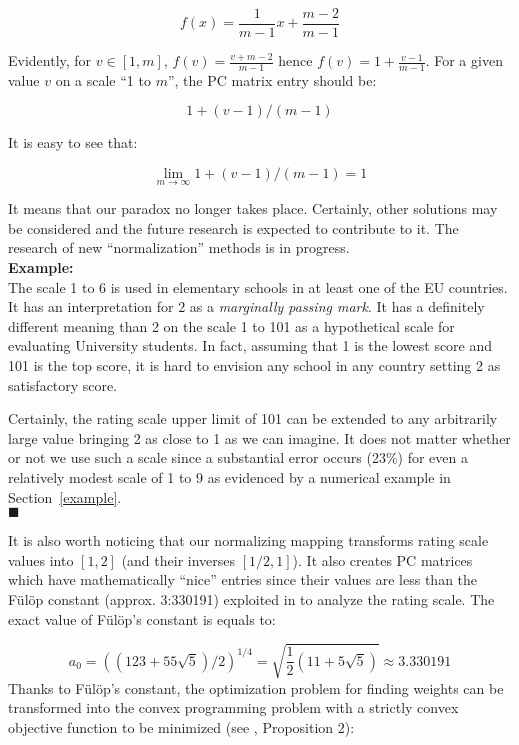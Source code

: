 \documentclass [12pt]{article}
\begin{document}
$$f(x)=\frac{1}{m-1}x+\frac{m-2}{m-1}$$

Evidently, for $v\in [1, m]$, $ f(v)=\frac{v+m-2}{m-1}$  hence $ f(v)=1+\frac{v-1}{m-1}$.
For a given value $v$ on a scale ``1 to $m$'', the PC matrix entry should be:

\begin{equation}
 1+(v-1)/(m-1) 
\end{equation}

\noindent It is easy to see that: 

$$\lim_{m\to\infty} {1+(v-1)/(m-1)}=1$$ 

It means that our  paradox no longer takes place. Certainly, other solutions may be considered and the future research is expected to contribute to it. The research of new ``normalization'' methods is in progress. \\

\noindent \textbf{Example:} \\

The scale 1 to 6 is used in elementary schools in at least one of the EU countries. It has an interpretation for 2 as a \textit{marginally passing mark}. It has a definitely different meaning than 2 on the scale 1 to 101 as a hypothetical scale for evaluating University students.
In fact, assuming that 1 is the lowest score and 101 is the top score, it is hard to envision any school in any country setting 2 as satisfactory
score.

Certainly, the rating scale upper limit of 101 can be extended to any arbitrarily large value bringing 2 as close to 1 as we can imagine. It does not matter whether or not we use such a scale since a substantial error occurs (23\%) for even a relatively modest scale of 1 to 9 as evidenced by a numerical example in Section~\ref{example}.\\
$\blacksquare$

It is also worth noticing that our normalizing mapping transforms rating scale values into $[1, 2]$ (and their inverses $ [1/2, 1] $). It also creates PC matrices which have mathematically ``nice'' entries since their values are less than the F\"ul\"op constant (approx. 3:330191) exploited in \cite{FKS2010} to analyze the rating scale. The exact value of F\"ul\"op's constant is equals to:

\begin{equation}
a_0=((123+55\sqrt 5)/2)^{1/4}=\sqrt{\frac{1}{2} \left(11+5
\sqrt{5}\right)}\approx 3.330191
\end{equation}
Thanks to F\"ul\"op's constant, the optimization problem for finding weights can be transformed into the convex programming problem with a strictly convex objective function to be minimized (see \cite{Fulop08}, Proposition $2$):
\end{document}
